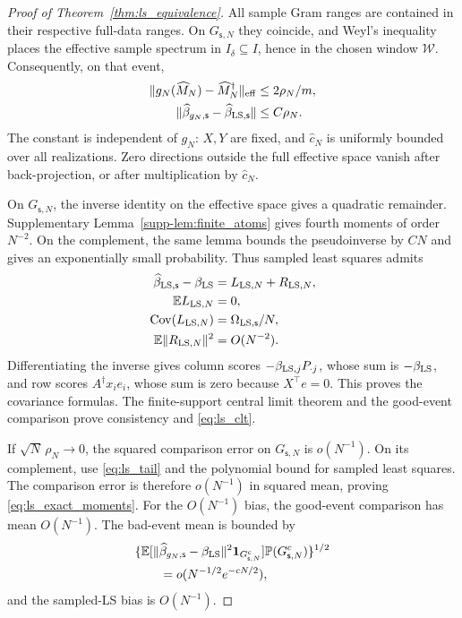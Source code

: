 \documentclass[pdflatex,iicol,sn-mathphys-ay]{sn-jnl}
\theoremstyle{thmstyleone}
\theoremstyle{thmstylethree}
\theoremstyle{thmstyletwo}
\newcommand{\E}{\mathbb E}
\newcommand{\Prob}{\mathbb P}
\newcommand{\norm}[1]{\lVert#1\rVert}
\begin{document}
\begin{proof}[Proof of Theorem~{\upshape\ref{thm:ls_equivalence}}]
All sample Gram ranges are contained in their respective full-data ranges.
On $G_{\mathsf{s},N}$ they coincide, and Weyl's inequality places the effective sample
spectrum in $I_\delta\subseteq I$, hence in the chosen window $\mathcal W$.
Consequently, on that event,
\[
 \begin{aligned}
 \norm{g_N(\widehat M_N)-\widehat M_N^\dagger}_{\rm eff}
       &\le 2\rho_N/m,\\
 \norm{\widehat\beta_{g_N,\mathsf{s}}-\widehat\beta_{{\rm LS},\mathsf{s}}}
       &\le C\rho_N.
 \end{aligned}
\]
The constant is independent of $g_N$: $X,Y$ are fixed, and
$\widehat c_N$ is uniformly bounded over all realizations.
Zero directions outside the full effective space vanish after back-projection,
or after multiplication by $\widehat c_N$.

On $G_{\mathsf{s},N}$, the inverse identity on the effective space gives a quadratic
remainder. Supplementary Lemma~\ref{supp-lem:finite_atoms} gives fourth moments of order $N^{-2}$.
On the complement, the same lemma bounds the pseudoinverse by $CN$ and gives
an exponentially small probability. Thus sampled least squares admits
\[
 \begin{aligned}
 \widehat\beta_{{\rm LS},\mathsf{s}}-\beta_{\rm LS}
   &=L_{{\rm LS},N}+R_{{\rm LS},N},\\
 \E L_{{\rm LS},N}&=0,\\
 \operatorname{Cov}(L_{{\rm LS},N})&=\Omega_{{\rm LS},\mathsf{s}}/N,\\
 \E\norm{R_{{\rm LS},N}}^2&=O(N^{-2}).
 \end{aligned}
\]
Differentiating the inverse gives column scores
$-\beta_{{\rm LS},j}P_{\cdot j}$, whose sum is $-\beta_{\rm LS}$,
and row scores $A^\dagger x_i e_i$, whose sum is zero because $X^\top e=0$.
This proves the covariance formulas. The finite-support central limit theorem
and the good-event comparison prove consistency and \eqref{eq:ls_clt}.

If $\sqrt N\,\rho_N\to0$, the squared comparison error on $G_{\mathsf{s},N}$ is
$o(N^{-1})$. On its complement, use \eqref{eq:ls_tail} and the polynomial
bound for sampled least squares. The comparison error is therefore
$o(N^{-1})$ in squared mean, proving \eqref{eq:ls_exact_moments}.
For the $O(N^{-1})$ bias, the good-event comparison has mean $O(N^{-1})$.
The bad-event mean is bounded by
\[
 \begin{aligned}
 &\{\E[\norm{\widehat\beta_{g_N,\mathsf{s}}-\beta_{\rm LS}}^2
                  \mathbf{1}_{G_{\mathsf{s},N}^c}]\Prob(G_{\mathsf{s},N}^c)\}^{1/2}\\
 &\qquad=o(N^{-1/2}e^{-cN/2}),
 \end{aligned}
\]
and the sampled-LS bias is $O(N^{-1})$.
\end{proof}
\end{document}
